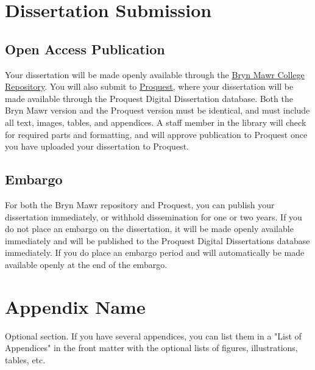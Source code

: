 \documentclass[12pt]{report}
\begin{document}
\chapter{Dissertation Submission}

\section{Open Access Publication}
Your dissertation will be made openly available through the \href{https://repository.brynmawr.edu/}{Bryn Mawr College Repository}. You will also submit to \href{https://www.proquest.com/}{Proquest}, where your dissertation will be made available through the Proquest Digital Dissertation database. Both the Bryn Mawr version and the Proquest version must be identical, and must include all text, images, tables, and appendices. A staff member in the library will check for required parts and formatting, and will approve publication to Proquest once you have uploaded your dissertation to Proquest.
\section{Embargo}
For both the Bryn Mawr repository and Proquest, you can publish your dissertation immediately, or withhold dissemination for one or two years. If you do not place an embargo on the dissertation, it will be made openly available immediately and will be published to the Proquest Digital Dissertations database immediately. If you do place an embargo period and will automatically be made available openly at the end of the embargo. 
\appendix
\chapter{Appendix Name}
Optional section. If you have several appendices, you can list them in a "List of Appendices" in the front matter with the optional lists of figures, illustrations, tables, etc.

\singlespacing
\printbibliography[heading=bibintoc, title={Bibliography}]
\end{document}
